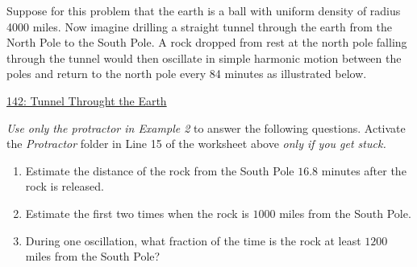 \documentclass{ximera}
\begin{document}
\begin{example}  \label{Ex:FEfe344trgfd}

Suppose for this problem that the earth is a ball with uniform density of radius 4000 miles. Now imagine drilling a straight tunnel through the earth from the North Pole to the South Pole. A rock dropped from rest at the north pole falling through the tunnel would then oscillate in simple harmonic motion between the poles and return to the north pole every 84  minutes as illustrated below. 

\begin{onlineOnly}
    \begin{center}
\end{center}
\end{onlineOnly}

\href{https://www.desmos.com/calculator/z5ya8iy2e4}{142: Tunnel Throught the Earth }


\emph{Use only the protractor in Example 2} to answer the following questions. Activate the \emph{Protractor} folder in Line 15 of the worksheet above \emph{only if you get stuck.} 
\begin{enumerate}
\item Estimate the distance of the rock from the South Pole $16.8$ minutes after the rock is released.

\item Estimate the first two times when the rock is $1000$ miles from the South Pole.

\item During one oscillation, what fraction of the time is the rock at least $1200$ miles from the South Pole?
\end{enumerate}




\end{example}
\end{document}
